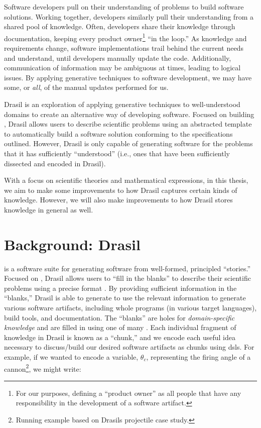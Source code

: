 Software developers pull on their understanding of problems to build software
solutions. Working together, developers similarly pull their understanding from
a shared pool of knowledge. Often, developers share their knowledge through
documentation, keeping every product owner\footnote{For our purposes, defining a
``product owner'' as all people that have any responsibility in the development
of a software artifact.} ``in the loop.'' As knowledge and requirements change,
software implementations trail behind the current needs and understand, until
developers manually update the code. Additionally, communication of information
may be ambiguous at times, leading to logical issues. By applying generative
techniques to software development, we may have some, or \textit{all}, of the
manual updates performed for us.

Drasil \cite{Drasil2021} is an exploration of applying generative techniques to
well-understood domains to create an alternative way of developing software.
Focused on building , Drasil allows users to describe scientific
problems using an abstracted  template to automatically build a
software solution conforming to the specifications outlined. However, Drasil is
only capable of generating software for the problems that it has sufficiently
``understood'' (i.e., ones that have been sufficiently dissected and encoded in
Drasil).

With a focus on scientific theories and mathematical expressions, in this
thesis, we aim to make some improvements to how Drasil captures certain kinds of
knowledge. However, we will also make improvements to how Drasil stores
knowledge in general as well.

\section{Background: Drasil}
\label{chap:introduction:sec:background}

 is a software suite
for generating software from well-formed, principled ``stories.'' Focused on
, Drasil allows users to ``fill in the blanks'' to describe their
scientific problems using a precise  format \cite{SmithAndLai2005}. By
providing sufficient information in the ``blanks,'' Drasil is able to generate
to use the relevant information to generate various software artifacts,
including whole programs (in various target languages), build tools, and
documentation. The ``blanks'' are holes for \textit{domain-specific knowledge}
and are filled in using one of many . Each individual fragment of
knowledge in Drasil is known as a ``chunk,'' and we encode each useful idea
necessary to discuss/build our desired software artifacts as chunks using
\acsp{dsl}. For example, if we wanted to encode a variable, \(\theta{}_{c}\),
representing the firing angle of a cannon\footnote{Running example based on
      Drasils \acs{projectile} case study.}, we might write:

